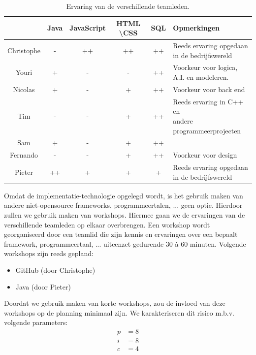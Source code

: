 \begin{table} [htbp]
	\centering
  	\caption{Ervaring van de verschillende teamleden.}
    \begin{tabular}{c|ccccl}
  		  	& Java 	& JavaScript & HTML \textbackslash CSS 		& SQL 	& Opmerkingen \\
  		  	\hline
  		  	Christophe & -	& ++ 		& ++ 		& ++ & \shortstack{ Reeds ervaring opgedaan \\ in de bedrijfswereld} \\
  		  	Youri & + & - & - & ++ & \shortstack{Voorkeur voor logica, \\ A.I. en modeleren.} \\
  		  	Nicolas & + & - & + & ++ & Voorkeur voor back end \\
  		  	Tim & - & - & + & ++ & \shortstack{Reeds ervaring in C++ en \\ andere programmeerprojecten} \\
  		  	Sam & + & - & + & ++ & \\
  		  	Fernando & - & - & + & ++ & Voorkeur voor design \\
  		  	Pieter & ++ & + & + & + & \shortstack{Reeds ervaring opgedaan \\ in de bedrijfswereld}
    \end{tabular}
  	\label{tab:skilllevel}
\end{table}
Omdat de implementatie-technologie opgelegd wordt, is het gebruik maken van andere niet-opensource frameworks, programmeertalen, ... geen optie. Hierdoor zullen we gebruik maken van workshops. Hiermee gaan we de ervaringen van de verschillende teamleden op elkaar overbrengen. Een workshop wordt georganiseerd door een teamlid die zijn kennis en ervaringen over een bepaalt framework, programmeertaal, ... uiteenzet gedurende 30 \`{a} 60 minuten. Volgende workshops zijn reeds gepland:
\begin{itemize}
	\item GitHub (door Christophe)
	\item Java (door Pieter)
\end{itemize}
Doordat we gebruik maken van korte workshops, zou de invloed van deze workshops op de planning minimaal zijn. We karakteriseren dit risico m.b.v. volgende parameters:
\begin{align*}
	p &= 8\\
	i &= 8\\
	c &= 4
\end{align*}

